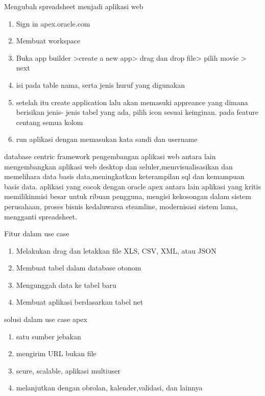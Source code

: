   Mengubah spreadsheet menjadi aplikasi web
  \begin{enumerate}
      \item Sign in apex.oracle.com
      \item Membuat workspace
      \item Buka app builder >create a new app>  drag dan drop file> pilih movie > next
      \item isi pada table nama, serta jenis huruf yang digunakan
      \item setelah itu create application lalu akan memasuki appreance yang dimana berisikan jenis- jenis tabel yang ada, pilih icon sesuai keinginan. pada feature centang semua kolom
      \item run aplikasi dengan memasukan kata sandi dan username
      
  \end{enumerate}
database centric framework pengembangan aplikasi web antara lain mengembangkan aplikasi web desktop dan seluler,memvisualisasikan dan memelihara data basis data,meningkatkan keterampilan sql dan kemampuan basis data. aplikasi  yang cocok dengan oracle apex antara lain aplikasi  yang kritis  memilikinmisi besar untuk ribuan pengguna, mengisi kekosongan dalam sistem perusahaan, proses bisnis kedaluwarsa steamline, modernisasi sistem lama, mengganti spreadsheet. 


Fitur dalam use case
\begin{enumerate}
    \item Melakukan drag dan letakkan file XLS, CSV, XML, atau JSON
    \item Membuat tabel dalam database otonom
    \item Mengunggah data ke tabel baru
    \item Membuat aplikasi berdasarkan tabel net
\end{enumerate}
 solusi dalam use case apex 
 \begin{enumerate}
     \item satu sumber jebakan
     \item mengirim URL bukan file
     \item scure, scalable, aplikasi multiuser
     \item melanjutkan dengan obrolan, kalender,validasi, dan lainnya
     
 \end{enumerate}
 
